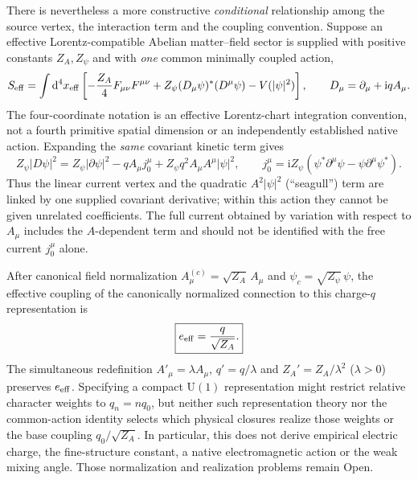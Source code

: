 \documentclass[11pt]{article}
\theoremstyle{definition}
\newcommand{\dd}{\mathrm{d}}
\newcommand{\ii}{\mathrm{i}}
\newcommand{\Uone}{\mathrm{U}(1)}
\begin{document}
There is nevertheless a more constructive \emph{conditional} relationship among the
source vertex, the interaction term and the coupling convention.  Suppose an
effective Lorentz-compatible Abelian matter--field sector is supplied with
positive constants $Z_A,Z_\psi$ and with \emph{one} common minimally coupled
action,
\begin{equation}
 S_{\rm eff}=\int \dd^4x_{\rm eff}\left[-\frac{Z_A}{4}F_{\mu\nu}F^{\mu\nu}
 +Z_\psi (D_\mu\psi)^*(D^\mu\psi)-V(|\psi|^2)\right],\qquad
 D_\mu=\partial_\mu+\ii qA_\mu.
 \label{eq:common_action_u1}
\end{equation}
The four-coordinate notation is an effective Lorentz-chart integration
convention, not a fourth primitive spatial dimension or an independently
established native action.  Expanding the \emph{same} covariant kinetic term gives
\begin{equation}
 Z_\psi|D\psi|^2=Z_\psi|\partial\psi|^2-qA_\mu j_0^\mu
  +Z_\psi q^2 A_\mu A^\mu|\psi|^2,\qquad
 j_0^\mu=\ii Z_\psi(\psi^*\partial^\mu\psi-\psi\partial^\mu\psi^*).
 \label{eq:common_action_vertices}
\end{equation}
Thus the linear current vertex and the quadratic $A^2|\psi|^2$
(``seagull'') term are linked by one supplied covariant derivative;
within this action they cannot be given unrelated coefficients.  The full
current obtained by variation with respect to $A_\mu$ includes the
$A$-dependent term and should not be identified with the free current $j_0^\mu$
alone.

After canonical field normalization $A^{(c)}_\mu=\sqrt{Z_A}\,A_\mu$
and $\psi_c=\sqrt{Z_\psi}\,\psi$, the effective coupling of the
canonically normalized connection to this charge-$q$ representation is
\begin{equation}
 \boxed{e_{\rm eff}=\frac{q}{\sqrt{Z_A}}.}
 \label{eq:common_action_canonical_coupling}
\end{equation}
The simultaneous redefinition $A'_{\mu}=\lambda A_\mu$,
$q'=q/\lambda$ and $Z_A'=Z_A/\lambda^2$ ($\lambda>0$) preserves
$e_{\rm eff}$.  Specifying a compact $\Uone$ representation might
restrict relative character weights to $q_n=nq_0$, but neither such
representation theory nor the common-action identity selects which
physical closures realize those weights or the base coupling
$q_0/\sqrt{Z_A}$.  In particular, this does not derive empirical
electric charge, the fine-structure constant, a native electromagnetic
action or the weak mixing angle.  Those normalization and realization
problems remain Open.
\end{document}
